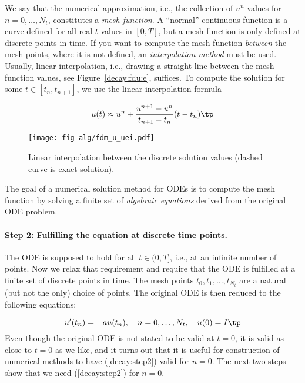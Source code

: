 \documentclass[graybox,sectrefs,envcountresetchap,open=right,final]{svmonodo}
\newenvironment{notice_mdfboxadmon}[1][]{
\begin{notice_mdfboxmdframed}[frametitle=#1]
}
{
\end{notice_mdfboxmdframed}
}
\begin{document}
We say that the numerical approximation, i.e.,
the collection of $u^n$ values for $n=0,\ldots,N_t$,
constitutes a \emph{mesh function}.
A ``normal'' continuous function is a curve defined for all real $t$
values in $[0,T]$, but a mesh function is only defined at discrete
points in time. If you want to compute the mesh function \emph{between} the
mesh points, where it is not defined, an \emph{interpolation method} must be
used. Usually, linear interpolation, i.e., drawing a straight line between
the mesh function values, see Figure~\ref{decay:fdu:e}, suffices.
To compute the solution for some $t\in [t_n, t_{n+1}]$, we use the
linear interpolation formula

\begin{equation}
u(t) \approx u^n + \frac{u^{n+1}-u^n}{t_{n+1}-t_n}(t - t_n)\tp
\end{equation}


\begin{figure}[!ht]  %
  \centerline{\texttt{[image: fig-alg/fdm\_u\_uei.pdf]}}
  \caption{
  Linear interpolation between the discrete solution values (dashed curve is exact solution). \label{decay:fdu:ei}
  }
\end{figure}


\clearpage


\begin{notice_mdfboxadmon}[Notice]
The goal of a numerical solution method for ODEs is
to compute the mesh function by solving a finite set of
\emph{algebraic equations} derived from the original ODE problem.
\end{notice_mdfboxadmon}



\paragraph{Step 2: Fulfilling the equation at discrete time points.}
The ODE is supposed to hold for all $t\in (0,T]$, i.e., at an infinite
number of points. Now we relax that requirement and require that
the ODE is fulfilled at a finite set of discrete points in time.
The mesh points $t_0,t_1,\ldots,t_{N_t}$ are a natural
(but not the only) choice of points.
The original ODE is then reduced to  the following equations:

\begin{equation}
u^{\prime}(t_n) = -au(t_n),\quad n=0,\ldots,N_t,\quad u(0)=I\tp
\label{decay:step2}
\end{equation}
Even though the original ODE is not stated to be valid at $t=0$, it
is valid as close to $t=0$ as we like, and it turns out that it
is useful for construction of numerical methods to have
(\ref{decay:step2}) valid for $n=0$. The next two steps show that we
need (\ref{decay:step2}) for $n=0$.
\end{document}
